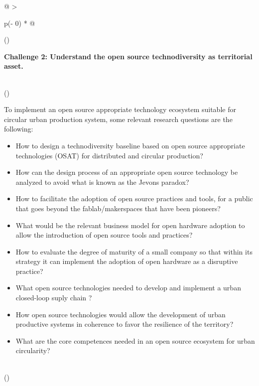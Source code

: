 \documentclass[
  11pt,
  a4paperpaper,
  onecolumn]{article}
\begin{document}
\begin{longtable}[]{@{}
  >{\raggedright\arraybackslash}p{(\columnwidth - 0\tabcolsep) * }@{}}
\toprule()
\begin{minipage}[b]{\linewidth}\raggedright
\textbf{Challenge 2: Understand the open source technodiversity as
territorial asset.}
\end{minipage} \\
\midrule()
\endhead
\begin{minipage}[t]{\linewidth}\raggedright
To implement an open source appropriate technology ecosystem suitable
for circular urban production system, some relevant research questions
are the following:

\begin{itemize}
\item
  How to design a technodiversity baseline based on open source
  appropriate technologies (OSAT) for distributed and circular
  production?
\item
  How can the design process of an appropriate open source technology be
  analyzed to avoid what is known as the Jevons paradox?
\item
  How to facilitate the adoption of open source practices and tools, for
  a public that goes beyond the fablab/makerspaces that have been
  pioneers?
\item
  What would be the relevant business model for open hardware adoption
  to allow the introduction of open source tools and practices?
\item
  How to evaluate the degree of maturity of a small company so that
  within its strategy it can implement the adoption of open hardware as
  a disruptive practice?
\item
  What open source technologies needed to develop and implement a urban
  closed-loop suply chain ?
\item
  How open source technologies would allow the development of urban
  productive systems in coherence to favor the resilience of the
  territory?
\item
  What are the core competences needed in an open source ecosystem for
  urban circularity?
\end{itemize}
\end{minipage} \\
\bottomrule()
\end{longtable}

\vspace{-0.5cm}
\end{document}
